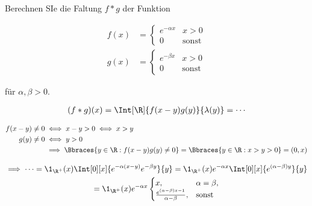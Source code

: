 
\begin{exercise}

Berechnen SIe die Faltung $f \ast g$ der Funktion

\begin{align*}
    f(x)
    & =
    \begin{cases}
        e^{-\alpha x} & x > 0 \\
        0             & \text{sonst}
    \end{cases} \\
    g(x)
    & =
    \begin{cases}
        e^{-\beta x} & x > 0 \\
        0            & \text{sonst}
    \end{cases}
\end{align*}

für $\alpha, \beta > 0$.

\end{exercise}


\begin{solution}

\phantom{}

\begin{align*}
    (f \ast g)(x)
    =
    \Int[\R]{f(x - y) g(y)}{\lambda(y)}
    =
    \cdots
\end{align*}

\begin{align*}
    f(x - y) \neq 0
    & \iff
    x - y > 0
    \iff
    x > y \\
    g(y) \neq 0
    & \iff
    y > 0 \\
    & \implies
    \Bbraces{y \in \R: f(x - y) g(y) \neq 0}
    =
    \Bbraces{y \in \R: x > y > 0}
    =
    (0, x)
\end{align*}

\begin{multline*}
    \implies
    \cdots
    =
    \1_{\R^+}(x)
    \Int[0][x]
    {
        e^{-\alpha (x - y)}
        e^{-\beta y}
    }{y}
    =
    \1_{\R^+}(x)
    e^{-\alpha x}
    \Int[0][x]
    {
        e^{(\alpha - \beta) y}
    }{y} \\
    =
    \1_{\R^+}(x)
    e^{-\alpha x}
    \begin{cases}
        x,
        & \alpha = \beta, \\
        \frac
        {
            e^{(\alpha - \beta) x - 1}
        }{
            \alpha - \beta
        },
        & \text{sonst}
    \end{cases}
\end{multline*}

\end{solution}

